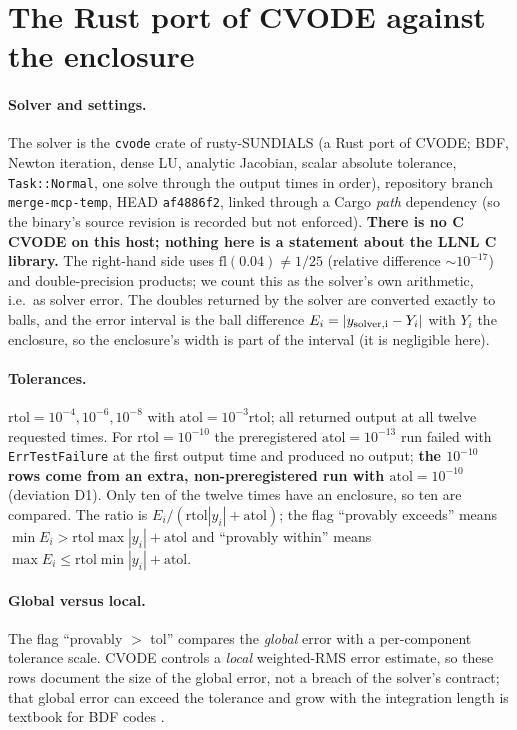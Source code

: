 \documentclass[11pt]{article}
\theoremstyle{remark}
\begin{document}
\section{The Rust port of CVODE against the enclosure}\label{sec:cmp}
\paragraph{Solver and settings.} The solver is the \texttt{cvode} crate of rusty-SUNDIALS (a Rust port of CVODE; BDF, Newton iteration, dense LU, analytic Jacobian, scalar absolute tolerance, \texttt{Task::Normal}, one solve through the output times in order), repository branch \texttt{merge-mcp-temp}, HEAD \texttt{af4886f2}, linked through a Cargo \emph{path} dependency (so the binary's source revision is recorded but not enforced). \textbf{There is no C CVODE on this host; nothing here is a statement about the LLNL C library.} The right-hand side uses $\mathrm{fl}(0.04)\ne1/25$ (relative difference $\sim10^{-17}$) and double-precision products; we count this as the solver's own arithmetic, i.e.\ as solver error. The doubles returned by the solver are converted exactly to balls, and the error interval is the ball difference $E_i=|y_{\rm solver,i}-Y_i|$ with $Y_i$ the enclosure, so the enclosure's width is part of the interval (it is negligible here).
\paragraph{Tolerances.} $\mathrm{rtol}=10^{-4},10^{-6},10^{-8}$ with $\mathrm{atol}=10^{-3}\mathrm{rtol}$; all returned output at all twelve requested times. For $\mathrm{rtol}=10^{-10}$ the preregistered $\mathrm{atol}=10^{-13}$ run failed with \texttt{ErrTestFailure} at the first output time and produced no output; \textbf{the $10^{-10}$ rows come from an extra, non-preregistered run with $\mathrm{atol}=10^{-10}$} (deviation D1). Only ten of the twelve times have an enclosure, so ten are compared. The ratio is $E_i/(\mathrm{rtol}|y_i|+\mathrm{atol})$; the flag ``provably exceeds'' means $\min E_i>\mathrm{rtol}\max|y_i|+\mathrm{atol}$ and ``provably within'' means $\max E_i\le\mathrm{rtol}\min|y_i|+\mathrm{atol}$.
\paragraph{Global versus local.} The flag ``provably $>$ tol'' compares the \emph{global} error with a per-component tolerance scale. CVODE controls a \emph{local} weighted-RMS error estimate, so these rows document the size of the global error, not a breach of the solver's contract; that global error can exceed the tolerance and grow with the integration length is textbook for BDF codes \cite{hw,sundialsdocs}.
\end{document}
